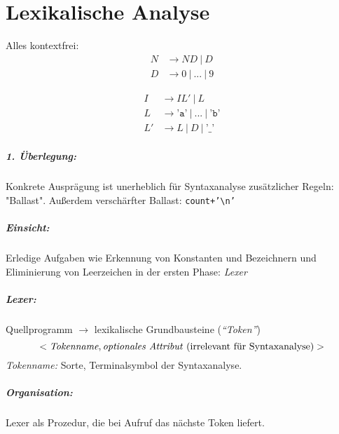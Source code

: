 \chapter{Lexikalische Analyse}
Alles kontextfrei:
\begin{align*}
 N &\to ND\ |\ D \tag{für natürliche Zahlen}\\
 D &\to 0\ |\ ...\ |\ 9
\end{align*}

\begin{align*}
 I &\to IL'\ |\ L \tag{für Bezeichner}\\
 L &\to \texttt{'a'}\ |\ ...\ |\ \texttt{'b'}\\
 L' &\to L\ |\ D\ |\ \texttt{'\_'}
\end{align*}

\paragraph{1. Überlegung:} Konkrete Ausprägung ist unerheblich für Syntaxanalyse zusätzlicher Regeln: "Ballast". Außerdem verschärfter Ballast: \texttt{\dq\textvisiblespace\textvisiblespace  count\textvisiblespace +'\textbackslash n'\dq}
\paragraph{Einsicht:} Erledige Aufgaben wie Erkennung von Konstanten und Bezeichnern und Eliminierung von Leerzeichen in der ersten Phase: \emph{Lexer}
\paragraph{Lexer:} Quellprogramm $\to$ lexikalische Grundbausteine (\emph{"`Token"'})
\[<\textit{Tokenname},\text{\textit{optionales Attribut} (irrelevant für Syntaxanalyse)}>\]
\emph{Tokenname:} Sorte, Terminalsymbol der Syntaxanalyse.
\paragraph{Organisation:} Lexer als Prozedur, die bei Aufruf das nächste Token liefert.

